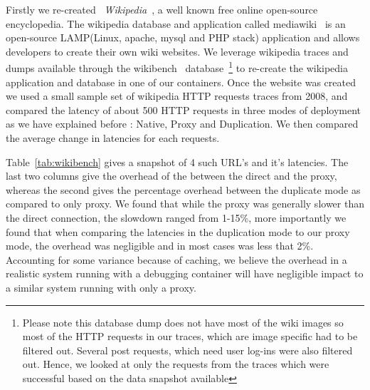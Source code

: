 Firstly we re-created ~\emph{Wikipedia}~\cite{wikipedia}, a well known free online open-source encyclopedia. 
The wikipedia database and application called mediawiki~\cite{mediawiki} is an open-source LAMP(Linux, apache, mysql and PHP stack) application and allows developers to create their own wiki websites.
We leverage wikipedia traces and dumps available through the wikibench~\cite{wikibench} database~\footnote{Please note this database dump does not have most of the wiki images so most of the HTTP requests in our traces, which are image specific had to be filtered out. 
Several post requests, which need user log-ins were also filtered out. 
Hence, we looked at only the requests from the traces which were successful based on the data snapshot available} to re-create the wikipedia application and database in one of our containers.
Once the website was created we used a small sample set of wikipedia HTTP requests traces from 2008, and compared the latency of about 500 HTTP requests in three modes of deployment as we have explained before : Native, Proxy and Duplication. 
We then compared the average change in latencies for each requests.

Table~\ref{tab:wikibench} gives a snapshot of 4 such URL's and it's latencies. 
The last two columns give the overhead of the  between the direct and the proxy, whereas the second gives the percentage overhead between the duplicate mode as compared to only proxy.
We found that while the proxy was generally slower than the direct connection, the slowdown ranged from 1-15\%, more importantly we found that when comparing the latencies in the duplication mode to our proxy mode, the overhead was negligible and in most cases was less that 2\%. 
Accounting for some variance because of caching, we believe the overhead in a realistic system running with a debugging container will have negligible impact to a similar system running with only a proxy. 

\begin{comment}
One of the difficulties in accurately measuring latencies was that since most GIT page fetches were sub-second, database, and webservers caching came into play. 
This meant that in several of our initial runs the latency observed for some of the requests were better with the proxy or duplicator, compared to the native execution.
However after a couple of runs of the entire trace, the latencies observed were consistent.
\end{comment}

